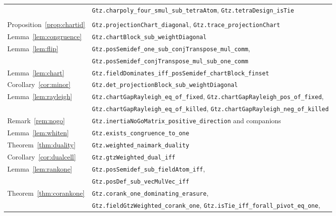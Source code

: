 {\begin{longtable}{@{}ll@{}}
                               & \texttt{Gtz.charpoly\_four\_smul\_sub\_tetraAtom},
                                 \texttt{Gtz.tetraDesign\_isTie} \\
\addlinespace
\multicolumn{2}{@{}l}{\emph{\S\ref{sec:chart}, the projection chart}}\\
Proposition~\ref{prop:chartid} & \texttt{Gtz.projectionChart\_diagonal},
                                 \texttt{Gtz.trace\_projectionChart} \\
Lemma~\ref{lem:congruence}     & \texttt{Gtz.chartBlock\_sub\_weightDiagonal} \\
Lemma~\ref{lem:flip}           & \texttt{Gtz.posSemidef\_one\_sub\_conjTranspose\_mul\_comm}, \\
                               & \texttt{Gtz.posSemidef\_conjTranspose\_mul\_sub\_one\_comm} \\
Lemma~\ref{lem:chart}          & \texttt{Gtz.fieldDominates\_iff\_posSemidef\_chartBlock\_finset} \\
Corollary~\ref{cor:minor}      & \texttt{Gtz.det\_projectionBlock\_sub\_weightDiagonal} \\
Lemma~\ref{lem:rayleigh}       & \texttt{Gtz.chartGapRayleigh\_eq\_of\_fixed},
                                 \texttt{Gtz.chartGapRayleigh\_pos\_of\_fixed}, \\
                               & \texttt{Gtz.chartGapRayleigh\_eq\_of\_killed},
                                 \texttt{Gtz.chartGapRayleigh\_neg\_of\_killed} \\
Remark~\ref{rem:nogo}          & \texttt{Gtz.inertiaNoGoMatrix\_positive\_direction} and companions \\
Lemma~\ref{lem:whiten}         & \texttt{Gtz.exists\_congruence\_to\_one} \\
Theorem~\ref{thm:duality}      & \texttt{Gtz.weighted\_naimark\_duality} \\
Corollary~\ref{cor:dualcell}   & \texttt{Gtz.gtzWeighted\_dual\_iff} \\
Lemma~\ref{lem:rankone}        & \texttt{Gtz.posSemidef\_sub\_fieldAtom\_iff}, \\
                               & \texttt{Gtz.posDef\_sub\_vecMulVec\_iff} \\
Theorem~\ref{thm:corankone}    & \texttt{Gtz.corank\_one\_dominating\_erasure}, \\
                               & \texttt{Gtz.fieldGtzWeighted\_corank\_one},
                                 \texttt{Gtz.isTie\_iff\_forall\_pivot\_eq\_one}, \\

\end{longtable}}

